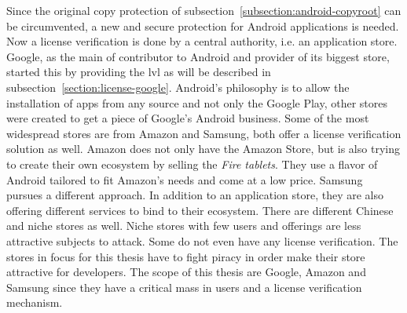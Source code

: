 Since the original copy protection of subsection~\ref{subsection:android-copyroot} can be circumvented, a new and secure protection for Android applications is needed.
Now a license verification is done by a central authority, i.e. an application store.
Google, as the main of contributor to Android and provider of its biggest store, started this by providing the \gls{lvl} as will be described in subsection~\ref{section:license-google}.
\newline
Android’s philosophy is to allow the installation of apps from any source and not only the Google Play, other stores were created to get a piece of Google's Android business.
Some of the most widespread stores are from Amazon and Samsung, both offer a license verification solution as well.
\newpage
Amazon does not only have the Amazon Store, but is also trying to create their own ecosystem by selling the \textit{Fire tablets}.
They use a flavor of Android tailored to fit Amazon's needs and come at a low price.
\newline
Samsung pursues a different approach.
In addition to an application store, they are also offering different services to bind to their ecosystem.
\newline
There are different Chinese and niche stores as well.
Niche stores with few users and offerings are less attractive subjects to attack.
Some do not even have any license verification.
\newline
The stores in focus for this thesis have to fight piracy in order make their store attractive for developers.
\newline
\newline
The scope of this thesis are Google, Amazon and Samsung since they have a critical mass in users and a license verification mechanism.

